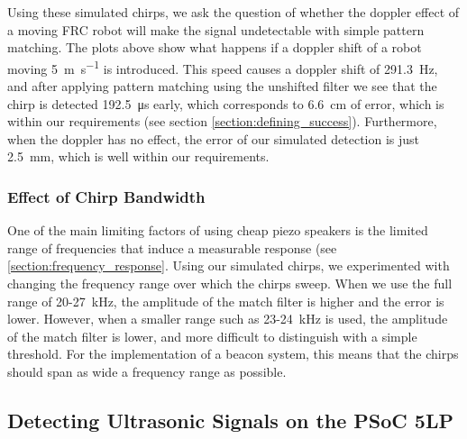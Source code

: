 \documentclass{article}
\begin{document}
      Using these simulated chirps, we ask the question of whether the doppler effect of a moving FRC robot will make the signal undetectable with simple pattern matching. The plots above show what happens if a doppler shift of a robot moving \SI{5}{\meter\per\second} is introduced. This speed causes a doppler shift of \SI{291.3}{\hertz}, and after applying pattern matching using the unshifted filter we see that the chirp is detected \SI{192.5}{\micro\second} early, which corresponds to \SI{6.6}{\centi\meter} of error, which is within our requirements (see section \ref{section:defining_success}). Furthermore, when the doppler has no effect, the error of our simulated detection is just \SI{2.5}{\milli\meter}, which is well within our requirements.

    \subsubsection{Effect of Chirp Bandwidth}

      One of the main limiting factors of using cheap piezo speakers is the limited range of frequencies that induce a measurable response (see \ref{section:frequency_response}. Using our simulated chirps, we experimented with changing the frequency range over which the chirps sweep. When we use the full range of 20-27\SI{}{\kilo\hertz}, the amplitude of the match filter is higher and the error is lower. However, when a smaller range such as 23-24\SI{}{\kilo\hertz} is used, the amplitude of the match filter is lower, and more difficult to distinguish with a simple threshold. For the implementation of a beacon system, this means that the chirps should span as wide a frequency range as possible.

  \subsection{Detecting Ultrasonic Signals on the PSoC 5LP}


\end{document}
